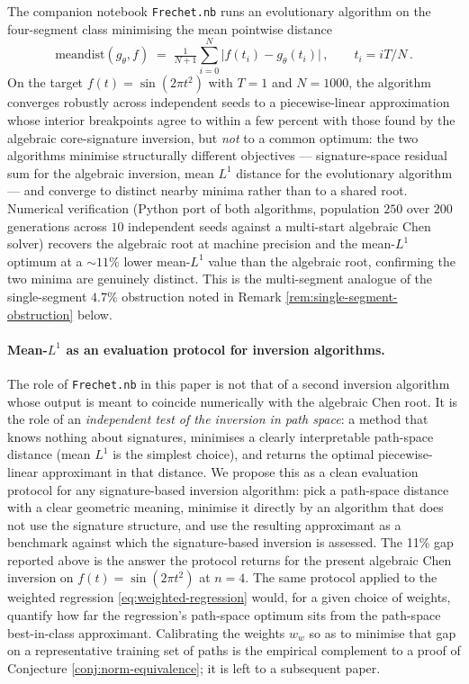 \documentclass[12pt,english]{article}
\newcommand{\nbfile}[1]{\nolinkurl{#1}}
\theoremstyle{remark}
\begin{document}
The companion notebook \nbfile{Frechet.nb} runs an evolutionary algorithm
on the four-segment class minimising the mean pointwise distance
\[
\mathrm{meandist}(g_{\theta},f)\;=\;\tfrac{1}{N+1}\sum_{i=0}^{N}\bigl|f(t_{i})-g_{\theta}(t_{i})\bigr|\,,\qquad t_{i}=iT/N\,.
\]
On the target $f(t)=\sin(2\pi t^{2})$ with $T=1$ and $N=1000$, the
algorithm converges robustly across independent seeds to a piecewise-linear
approximation whose interior breakpoints agree to within a few percent
with those found by the algebraic core-signature inversion, but \emph{not}
to a common optimum: the two algorithms minimise structurally different
objectives --- signature-space residual sum for the algebraic inversion,
mean $L^{1}$ distance for the evolutionary algorithm --- and converge
to distinct nearby minima rather than to a shared root. Numerical verification
(Python port of both algorithms, population $250$ over $200$ generations
across $10$ independent seeds against a multi-start algebraic Chen solver)
recovers the algebraic root at machine precision and the mean-$L^{1}$
optimum at a $\sim11\%$ lower mean-$L^{1}$ value than the algebraic
root, confirming the two minima are genuinely distinct. This is the
multi-segment analogue of the single-segment $4.7\%$ obstruction noted
in Remark \ref{rem:single-segment-obstruction} below.

\paragraph{Mean-$L^{1}$ as an evaluation protocol for inversion algorithms.}
The role of \nbfile{Frechet.nb} in this paper is not that of a second
inversion algorithm whose output is meant to coincide numerically with
the algebraic Chen root. It is the role of an \emph{independent test
of the inversion in path space}: a method that knows nothing about
signatures, minimises a clearly interpretable path-space distance
(mean $L^{1}$ is the simplest choice), and returns the optimal
piecewise-linear approximant in that distance. We propose this as
a clean evaluation protocol for any signature-based inversion
algorithm: pick a path-space distance with a clear geometric meaning,
minimise it directly by an algorithm that does not use the signature
structure, and use the resulting approximant as a benchmark against
which the signature-based inversion is assessed. The 11\% gap reported
above is the answer the protocol returns for the present algebraic
Chen inversion on $f(t) = \sin(2\pi t^{2})$ at $n=4$. The same
protocol applied to the weighted regression
\eqref{eq:weighted-regression} would, for a given choice of weights,
quantify how far the regression's path-space optimum sits from the
path-space best-in-class approximant. Calibrating the weights $w_{w}$
so as to minimise that gap on a representative training set of paths
is the empirical complement to a proof of Conjecture
\ref{conj:norm-equivalence}; it is left to a subsequent paper.
\end{document}
